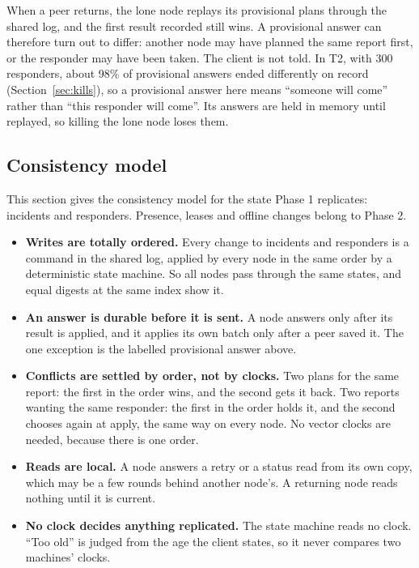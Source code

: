 When a peer returns, the lone node replays its provisional plans through the shared log, and the first result recorded still wins. A provisional answer can therefore turn out to differ: another node may have planned the same report first, or the responder may have been taken. The client is not told. In T2, with 300 responders, about 98\% of provisional answers ended differently on record (Section~\ref{sec:kills}), so a provisional answer here means ``someone will come'' rather than ``this responder will come''. Its answers are held in memory until replayed, so killing the lone node loses them.

\subsection{Consistency model}
\label{sec:consistency}

This section gives the consistency model for the state Phase 1 replicates: incidents and responders. Presence, leases and offline changes belong to Phase 2.

\begin{itemize}
  \item \textbf{Writes are totally ordered.} Every change to incidents and responders is a command in the shared log, applied by every node in the same order by a deterministic state machine. So all nodes pass through the same states, and equal digests at the same index show it.
  \item \textbf{An answer is durable before it is sent.} A node answers only after its result is applied, and it applies its own batch only after a peer saved it. The one exception is the labelled provisional answer above.
  \item \textbf{Conflicts are settled by order, not by clocks.} Two plans for the same report: the first in the order wins, and the second gets it back. Two reports wanting the same responder: the first in the order holds it, and the second chooses again at apply, the same way on every node. No vector clocks are needed, because there is one order.
  \item \textbf{Reads are local.} A node answers a retry or a status read from its own copy, which may be a few rounds behind another node's. A returning node reads nothing until it is current.
  \item \textbf{No clock decides anything replicated.} The state machine reads no clock. ``Too old'' is judged from the age the client states, so it never compares two machines' clocks.
\end{itemize}
